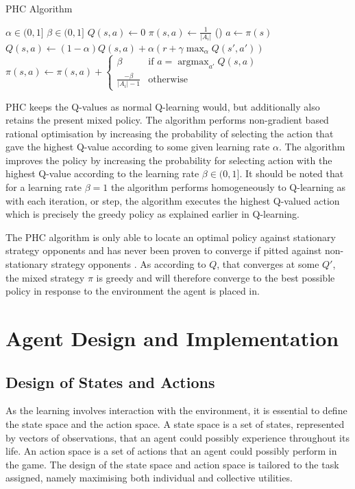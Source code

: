 \begin{algorithm}
\caption{PHC Algorithm}
\label{phc-algorithm}
$\alpha\in(0,1]$
$\beta\in(0,1]$
$Q(s,a)\leftarrow0$\;
$\pi(s,a)\leftarrow\frac{1}{\left|A_i\right|}$\;
\Begin(){
	$a\gets\pi(s)$\;
	$Q(s,a)\leftarrow (1-\alpha)Q(s,a)+\alpha\left(r+\gamma\max_{\alpha}Q\left(s',a'\right)\right)$\;
	$ \pi(s,a)\leftarrow\pi(s,a)+\begin{cases}
            \beta &\textrm{if } a=\operatorname{argmax}_{a'}Q(s,a)\\
            \frac{-\beta}{|A_i|-1} &\textrm{otherwise}
            \end{cases}$\;
}
\end{algorithm}

PHC keeps the Q-values as normal Q-learning would, but additionally also retains the present mixed policy. The algorithm performs non-gradient based rational optimisation by increasing the probability of selecting the action that gave the highest Q-value according to some given learning rate $\alpha$. The algorithm improves the policy by increasing the probability for selecting action with the highest Q-value according to the learning rate $\beta\in(0,1]$. It should be noted that for a learning rate $\beta=1$ the algorithm performs homogeneously to Q-learning as with each iteration, or step, the algorithm executes the highest Q-valued action which is precisely the greedy policy as explained earlier in Q-learning.

The PHC algorithm is only able to locate an optimal policy against stationary strategy opponents and has never been proven to converge if pitted against non-stationary strategy opponents \cite{BowlingMichael2002Mlua}. As according to $Q$, that converges at some $Q'$, the mixed strategy $\pi$ is greedy and will therefore converge to the best possible policy in response to the environment the agent is placed in. 

\section{Agent Design and Implementation}
\subsection{Design of States and Actions}
As the learning involves interaction with the environment, it is essential to define the state space and the action space. A state space is a set of states, represented by vectors of observations, that an agent could possibly experience throughout its life. An action space is a set of actions that an agent could possibly perform in the game. The design of the state space and action space is tailored to the task assigned, namely maximising both individual and collective utilities. 
